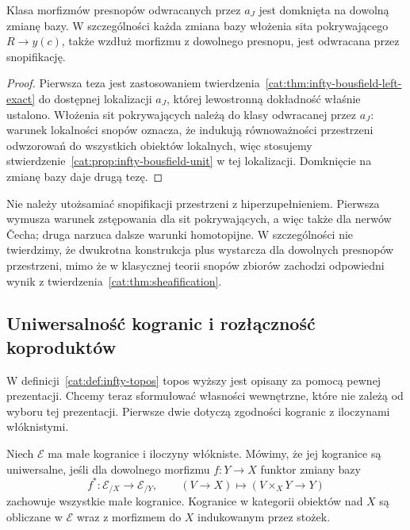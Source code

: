 \begin{wniosek}\label{cat:cor:infty-sheaf-universal-equivalence}
Klasa morfizmów presnopów odwracanych przez $a_J$ jest domknięta na dowolną zmianę bazy. W szczególności każda zmiana bazy włożenia sita pokrywającego $R\to y(c)$, także wzdłuż morfizmu z dowolnego presnopu, jest odwracana przez snopifikację.
\end{wniosek}
\begin{proof}
Pierwsza teza jest zastosowaniem twierdzenia~\ref{cat:thm:infty-bousfield-left-exact} do dostępnej lokalizacji $a_J$, której lewostronną dokładność właśnie ustalono. Włożenia sit pokrywających należą do klasy odwracanej przez $a_J$: warunek lokalności snopów oznacza, że indukują równoważności przestrzeni odwzorowań do wszystkich obiektów lokalnych, więc stosujemy stwierdzenie~\ref{cat:prop:infty-bousfield-unit} w tej lokalizacji. Domknięcie na zmianę bazy daje drugą tezę.
\end{proof}

Nie należy utożsamiać snopifikacji przestrzeni z hiperzupełnieniem. Pierwsza wymusza warunek zstępowania dla sit pokrywających, a więc także dla nerwów Čecha; druga narzuca dalsze warunki homotopijne. W szczególności nie twierdzimy, że dwukrotna konstrukcja plus wystarcza dla dowolnych presnopów przestrzeni, mimo że w klasycznej teorii snopów zbiorów zachodzi odpowiedni wynik z twierdzenia~\ref{cat:thm:sheafification}.

\subsection{Uniwersalność kogranic i rozłączność koproduktów}

W definicji~\ref{cat:def:infty-topos} topos wyższy jest opisany za pomocą pewnej prezentacji. Chcemy teraz sformułować własności wewnętrzne, które nie zależą od wyboru tej prezentacji. Pierwsze dwie dotyczą zgodności kogranic z iloczynami włóknistymi.

\begin{definicja}\label{cat:def:infty-topos-universal-colimits}
Niech $\mathcal E$ ma małe kogranice i iloczyny włókniste. Mówimy, że jej kogranice są uniwersalne, jeśli dla dowolnego morfizmu $f:Y\to X$ funktor zmiany bazy
\[
 f^*:\mathcal E_{/X}\longrightarrow\mathcal E_{/Y},\qquad
 (V\to X)\longmapsto(V\times_X Y\to Y)
\]
zachowuje wszystkie małe kogranice. Kogranice w kategorii obiektów nad $X$ są obliczane w $\mathcal E$ wraz z morfizmem do $X$ indukowanym przez stożek.
\end{definicja}

